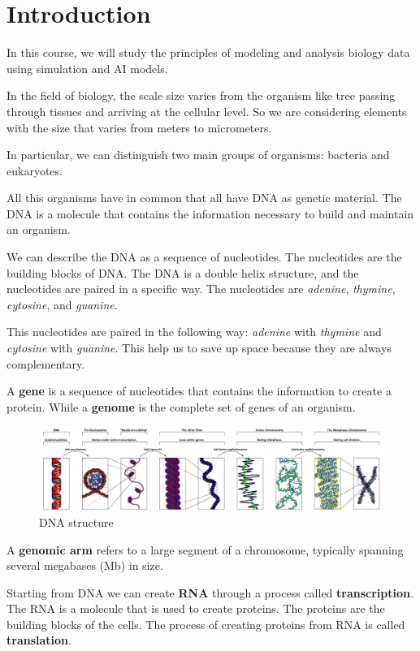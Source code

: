 \chapter{Introduction}
In this course, we will study the principles of modeling and analysis biology
data using simulation and AI models.

In the field of biology, the scale size varies from the organism like tree passing
through tissues and arriving at the cellular level. So we are considering elements
with the size that varies from meters to micrometers.

In particular, we can distinguish two main groups of organisms: bacteria and eukaryotes.

All this organisms have in common that all have DNA as genetic material. The DNA
is a molecule that contains the information necessary to build and maintain an
organism.

We can describe the DNA as a sequence of nucleotides. The nucleotides are the
building blocks of DNA. The DNA is a double helix structure, and the nucleotides
are paired in a specific way. The nucleotides are \textit{adenine}, \textit{thymine},
\textit{cytosine}, and \textit{guanine}.

This nucleotides are paired in the following way: \textit{adenine} with \textit{thymine}
and \textit{cytosine} with \textit{guanine}. This help us to save up space because
they are always complementary.

A \textbf{gene} is a sequence of nucleotides that contains the information to
create a protein. While a \textbf{genome} is the complete set of genes of an organism.

\begin{figure}[!ht]
    \centering
    \includegraphics[width=\textwidth]{img/DNA.png}
    \caption{DNA structure}
    \label{fig:dna}
\end{figure}

A \textbf{genomic arm} refers to a large segment of a chromosome, typically
spanning several megabases (Mb) in size.

Starting from DNA we can create \textbf{RNA} through a process called \textbf{transcription}.
The RNA is a molecule that is used to create proteins. The proteins are the
building blocks of the cells. The process of creating proteins from RNA is called
\textbf{translation}.


